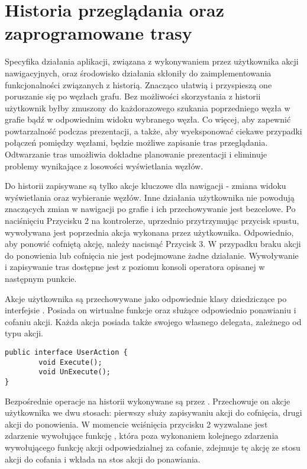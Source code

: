 \section{Historia przeglądania oraz zaprogramowane trasy}
\label{sec:history}
Specyfika działania aplikacji, związana z wykonywaniem przez użytkownika akcji nawigacyjnych, oraz środowisko działania skłoniły do zaimplementowania funkcjonalności związanych z historią. Znacząco ułatwią i przyspieszą one poruszanie się po węzłach grafu. Bez możliwości skorzystania z historii użytkownik byłby zmuszony do każdorazowego szukania poprzedniego węzła  w grafie bądź w odpowiednim widoku wybranego węzła. Co więcej, aby zapewnić powtarzalność podczas prezentacji, a także, aby wyeksponować ciekawe przypadki połączeń pomiędzy węzłami, będzie możliwe zapisanie tras przeglądania. Odtwarzanie tras umożliwia dokładne planowanie prezentacji i eliminuje problemy wynikające z losowości wyświetlania węzłów. 

Do historii zapisywane są tylko akcje kluczowe dla nawigacji - zmiana widoku wyświetlania oraz wybieranie węzłów. Inne działania użytkownika nie powodują znaczących zmian w nawigacji po grafie i ich przechowywanie jest bezcelowe. Po naciśnięciu Przycisku 2 na kontrolerze, uprzednio przytrzymując przycisk spustu, wywoływana jest poprzednia akcja wykonana przez użytkownika. Odpowiednio, aby ponowić cofniętą akcję, należy nacisnąć Przycisk 3. W przypadku braku akcji do ponowienia lub cofnięcia nie jest podejmowane żadne działanie. Wywoływanie i zapisywanie tras dostępne jest z poziomu konsoli operatora opisanej w następnym punkcie.

Akcje użytkownika są przechowywane jako odpowiednie klasy dziedziczące po interfejsie  . Posiada on wirtualne funkcje   oraz   służące odpowiednio ponawianiu i cofaniu akcji. Każda akcja posiada także swojego własnego delegata, zależnego od typu akcji. 

\begin{lstlisting}[caption={Interfejs UserAction}, label=lst:IUserAction]
public interface UserAction {
		void Execute();
		void UnExecute();
}
\end{lstlisting}


Bezpośrednie operacje na historii wykonywane są przez  . Przechowuje on akcje użytkownika we dwu stosach: pierwszy służy zapisywaniu akcji do cofnięcia, drugi akcji do ponowienia. W momencie wciśnięcia przycisku 2 wyzwalane jest zdarzenie wywołujące funkcję  , która poza wykonaniem kolejnego zdarzenia wywołującego funkcję akcji odpowiedzialnej za cofanie, zdejmuje tę akcję ze stosu akcji do cofania i wkłada na stos akcji do ponawiania.

